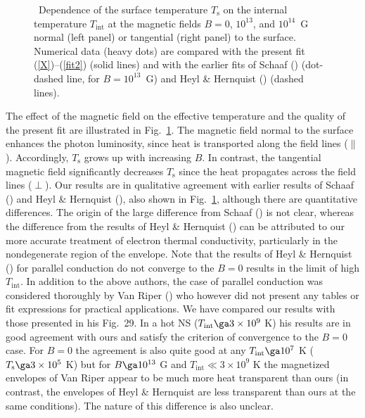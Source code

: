 \documentclass{aa}
\begin{document}
\begin{figure}
\centering
\sidecaption
\epsfxsize=12cm
\caption{~Dependence of the surface temperature $T_\mathrm{s}$ 
on the internal temperature $T_\mathrm{int}$
at the magnetic fields $B=0$, $10^{13}$, and $10^{14}$~G
normal (left panel) or tangential (right panel)
to the surface. Numerical data (heavy dots)
are compared with the present
fit (\protect\ref{X})--(\protect\ref{fit2})
(solid lines) 
and with the earlier fits 
of Schaaf (\protect\cite{schaaf90a}) (dot-dashed line,
for $B=10^{13}$~G)
and Heyl \& Hernquist
(\protect\cite{hh-multi}) (dashed lines).
}
\label{fig-tt}
\end{figure}
 
The effect of the magnetic field on the effective
temperature and the quality of the present fit
are illustrated in Fig.~\ref{fig-tt}.
The magnetic field normal to the surface enhances the
photon luminosity, 
since heat is transported along the field
lines ($\|$).
Accordingly, $T_\mathrm{s}$ grows up with increasing $B$.
In contrast, the tangential magnetic field
significantly decreases $T_\mathrm{s}$ since the heat propagates across
the field lines ($\perp$).
Our results are in qualitative agreement with earlier results
of Schaaf (\cite{schaaf90a}) and Heyl \& Hernquist
(\cite{hh-multi}), also shown in Fig.\ \ref{fig-tt},
although there are quantitative differences.
The origin of the large difference from Schaaf (\cite{schaaf90a})
is not clear, whereas
the difference from the results of Heyl \& Hernquist
(\cite{hh-multi}) can be attributed to our more accurate
treatment of electron thermal conductivity,
particularly in the nondegenerate region of the envelope.
Note that the results of Heyl \& Hernquist (\cite{hh-multi})
for parallel conduction do not
converge to the $B=0$ results in the limit of high $T_\mathrm{int}$. 
In addition to the above authors,
the case of parallel conduction was
considered thoroughly by Van Riper (\cite{kvr88}) who however
did not present any tables or fit expressions 
for practical applications. We have compared our results
with those presented in his Fig.\ 29. In a hot NS
($T_\mathrm{int} \ga 3 \times 10^9$ K) his results are
in good agreement with ours and satisfy the criterion of
convergence to the $B=0$ case. For $B= 0$ the agreement is
also quite good at any $T_\mathrm{int} \ga 10^7$ K
($T_\mathrm{s} \ga 3 \times 10^5$ K)
but for $B \ga 10^{13}$ G and
$T_\mathrm{int} \ll 3 \times 10^9$ K the magnetized
envelopes of Van Riper appear to be much more heat 
transparent than ours (in contrast, the envelopes
of Heyl \& Hernquist \cite{hh-multi} are less
transparent than ours at the same conditions).
The nature of this difference is also unclear.
 
\end{document}
